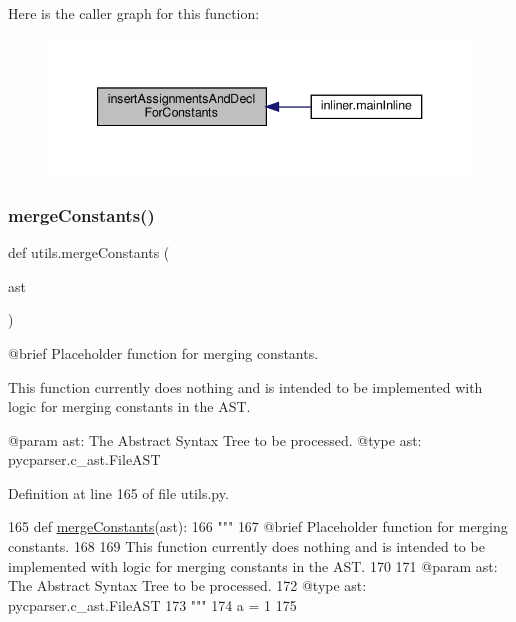 Here is the caller graph for this function\+:\nopagebreak
\begin{figure}[H]
\begin{center}
\leavevmode
\includegraphics[width=340pt]{namespaceutils_a694fa47d55cc41b3f9e86ab2f90e98f3_icgraph}
\end{center}
\end{figure}
\mbox{\label{namespaceutils_aaebca5d3cb4f9c54ab10670ed1ce52a9}} 
\subsubsection{\texorpdfstring{merge\+Constants()}{mergeConstants()}}
{\footnotesize\ttfamily def utils.\+merge\+Constants (\begin{DoxyParamCaption}\item[{}]{ast }\end{DoxyParamCaption})}

\begin{DoxyVerb}@brief Placeholder function for merging constants.

This function currently does nothing and is intended to be implemented with logic for merging constants in the AST.

@param ast: The Abstract Syntax Tree to be processed.
@type ast: pycparser.c_ast.FileAST
\end{DoxyVerb}
 

Definition at line 165 of file utils.\+py.


\begin{DoxyCode}
165 \textcolor{keyword}{def }\hyperlink{namespaceutils_aaebca5d3cb4f9c54ab10670ed1ce52a9}{mergeConstants}(ast):
166     \textcolor{stringliteral}{"""
}
167 \textcolor{stringliteral}{    @brief Placeholder function for merging constants.
}
168 \textcolor{stringliteral}{
}
169 \textcolor{stringliteral}{    This function currently does nothing and is intended to be implemented with logic for merging constants
       in the AST.
}
170 \textcolor{stringliteral}{
}
171 \textcolor{stringliteral}{    @param ast: The Abstract Syntax Tree to be processed.
}
172 \textcolor{stringliteral}{    @type ast: pycparser.c\_ast.FileAST
}
173 \textcolor{stringliteral}{    """}
174     a = 1
175 
\end{DoxyCode}
\mbox{\label{namespaceutils_a6c1d5e886507ec0741fb0fce3f642c5b}} 
